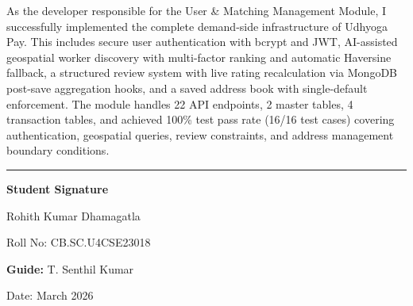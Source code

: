 \documentclass[12pt,a4paper]{article}
\begin{document}
As the developer responsible for the User \& Matching Management Module, I successfully implemented the complete demand-side infrastructure of Udhyoga Pay. This includes secure user authentication with bcrypt and JWT, AI-assisted geospatial worker discovery with multi-factor ranking and automatic Haversine fallback, a structured review system with live rating recalculation via MongoDB post-save aggregation hooks, and a saved address book with single-default enforcement. The module handles 22 API endpoints, 2 master tables, 4 transaction tables, and achieved 100\% test pass rate (16/16 test cases) covering authentication, geospatial queries, review constraints, and address management boundary conditions.

\vspace{1cm}

\begin{center}
\rule{0.5\textwidth}{0.4pt}

\vspace{0.5cm}

\textbf{Student Signature}

\vspace{0.3cm}

Rohith Kumar Dhamagatla

Roll No: CB.SC.U4CSE23018

\vspace{0.8cm}

\textbf{Guide:} T. Senthil Kumar

\vspace{0.3cm}

Date: March 2026
\end{center}
\end{document}
